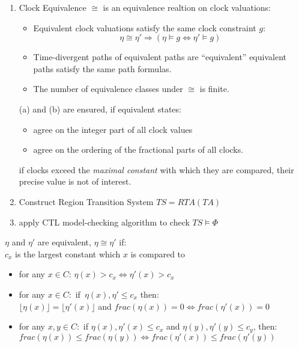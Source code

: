 \documentclass[a4paper, 10pt]{article}
\begin{document}
\begin{mdframed}
\begin{enumerate}
\begin{enumerate}
    \end{enumerate}
    \item Clock Equivalence $\cong$ is an equivalence realtion on clock valuations:
    \begin{itemize}
        \item Equivalent clock valuations satisfy the same clock constraint $g$:
        \[ \eta\cong\eta'\Rightarrow(\eta\models g \iff \eta'\models g) \]
        \item Time-divergent paths of equivalent paths are ``equivalent'' \follows equivalent paths satisfy the same path formulas.
        \item The number of equivalence classes under $\cong$ is finite.
    \end{itemize}
    (a) and (b) are ensured, if equivalent states:
    \begin{itemize}
        \item agree on the integer part of all clock values
        \item agree on the ordering of the fractional parts of all clocks.
    \end{itemize}
    if clocks exceed the \emph{maximal constant} with which they are compared, their precise value is not of interest.
    \item Construct Region Transition System $TS=RTA(TA)$
    \item apply CTL model-checking algorithm to check $TS\models\Phi$
\end{enumerate}
$\eta$ and $\eta'$ are equivalent, $\eta\cong\eta'$ if: \\
{\tiny $c_x$ is the largest constant which $x$ is compared to
 }
\begin{itemize}
    \item for any $x\in C:\,\eta(x)>c_x \iff \eta'(x)>c_x$
    \item for any $x\in C:$ if $\,\eta(x),\eta'\leq c_x$ then: \\
    $\lfloor\eta(x)\rfloor = \lfloor\eta'(x)\rfloor$ and $frac(\eta(x))=0 \iff frac(\eta'(x))=0$
    \item for any $x,y\in C:$ if $\eta(x),\eta'(x)\leq c_x$ and $\eta(y),\eta'(y)\leq c_y$, then: \\
    $frac(\eta(x))\leq frac(\eta(y)) \iff frac(\eta'(x))\leq frac(\eta'(y))$
\end{itemize}
\begin{center}

\end{center}
\end{mdframed}
\end{document}
